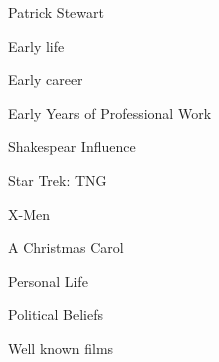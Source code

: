 \documentclass{beamer}
\begin{document}
\begin{frame}{Patrick Stewart}

\end{frame}
\begin{frame}{Early life}

\end{frame}
\begin{frame}{Early career}

\end{frame}
\begin{frame}{Early Years of Professional Work}

\end{frame}
\begin{frame}{Shakespear Influence}

\end{frame}
\begin{frame}{Star Trek: TNG}

\end{frame}
\begin{frame}{X-Men}

\end{frame}
\begin{frame}{A Christmas Carol}

\end{frame}

\begin{frame}{Personal Life}

\end{frame}
\begin{frame}{Political Beliefs}

\end{frame}
\begin{frame}{Well known films}

\end{frame}
\end{document}
